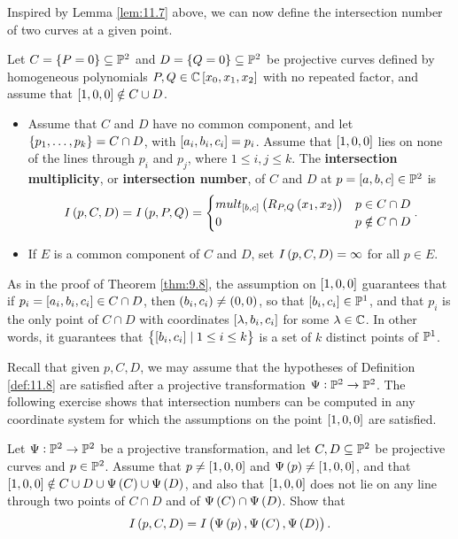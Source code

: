 Inspired by Lemma \ref{lem:11.7} above, we can now define the intersection number of two curves at a given point.

\begin{definition}
\label{def:11.8}
Let $ C = \cbr{P = 0} \subseteq \P^2 $ and $ D = \cbr{Q = 0} \subseteq \P^2 $ be projective curves defined by homogeneous polynomials $ P, Q \in \C\sbr{x_0, x_1, x_2} $ with no repeated factor, and assume that $ \sbr{1, 0, 0} \notin C \cup D $.
\begin{itemize}
\item Assume that $ C $ and $ D $ have no common component, and let $ \cbr{p_1, \dots, p_k} = C \cap D $, with $ \sbr{a_i, b_i, c_i} = p_i $. Assume that $ \sbr{1, 0, 0} $ lies on none of the lines through $ p_i $ and $ p_j $, where $ 1 \le i, j \le k $. The \textbf{intersection multiplicity}, or \textbf{intersection number}, of $ C $ and $ D $ at $ p = \sbr{a, b, c} \in \P^2 $ is
$$ I\br{p, C, D} = I\br{p, P, Q} =
\begin{cases}
mult_{\sbr{b, c}}\br{R_{P, Q}\br{x_1, x_2}} & p \in C \cap D \\
0 & p \notin C \cap D
\end{cases}.
$$
\item If $ E $ is a common component of $ C $ and $ D $, set $ I\br{p, C, D} = \infty $ for all $ p \in E $.
\end{itemize}
\end{definition}

\pagebreak

\begin{remark}
As in the proof of Theorem \ref{thm:9.8}, the assumption on $ \sbr{1, 0, 0} $ guarantees that if $ p_i = \sbr{a_i, b_i, c_i} \in C \cap D $, then $ \br{b_i, c_i} \ne \br{0, 0} $, so that $ \sbr{b_i, c_i} \in \P^1 $, and that $ p_i $ is the only point of $ C \cap D $ with coordinates $ \sbr{\lambda, b_i, c_i} $ for some $ \lambda \in \C $. In other words, it guarantees that $ \cbr{\sbr{b_i, c_i} \mid 1 \le i \le k} $ is a set of $ k $ distinct points of $ \P^1 $.
\end{remark}

Recall that given $ p, C, D $, we may assume that the hypotheses of Definition \ref{def:11.8} are satisfied after a projective transformation $ \Psi : \P^2 \to \P^2 $. The following exercise shows that intersection numbers can be computed in any coordinate system for which the assumptions on the point $ \sbr{1, 0, 0} $ are satisfied.

\begin{exercise}
Let $ \Psi : \P^2 \to \P^2 $ be a projective transformation, and let $ C, D \subseteq \P^2 $ be projective curves and $ p \in \P^2 $. Assume that $ p \ne \sbr{1, 0, 0} $ and $ \Psi\br{p} \ne \sbr{1, 0, 0} $, and that $ \sbr{1, 0, 0} \notin C \cup D \cup \Psi\br{C} \cup \Psi\br{D} $, and also that $ \sbr{1, 0, 0} $ does not lie on any line through two points of $ C \cap D $ and of $ \Psi\br{C} \cap \Psi\br{D} $. Show that
$$ I\br{p, C, D} = I\br{\Psi\br{p}, \Psi\br{C}, \Psi\br{D}}. $$
\end{exercise}


